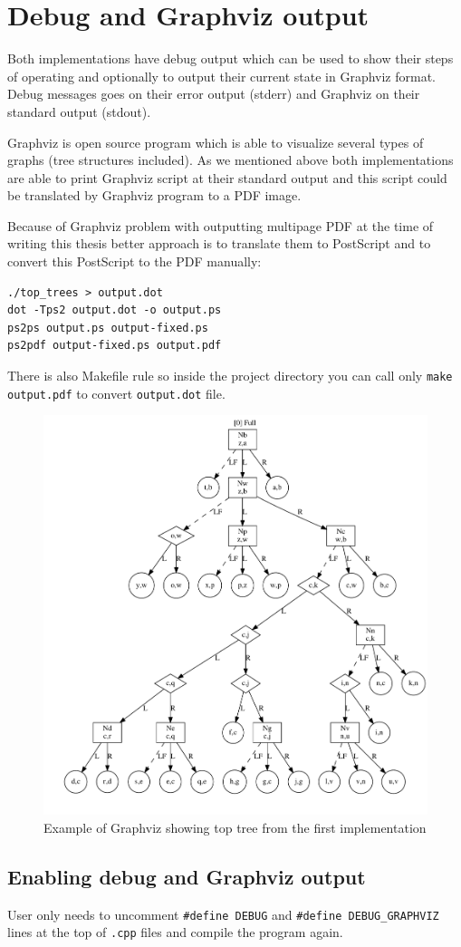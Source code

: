 \goodbreak

\section{Debug and Graphviz output}

Both implementations have debug output which can be used to show their
steps of operating and optionally to output their current state in Graphviz
format. Debug messages goes on their error output (stderr) and Graphviz on
their standard output (stdout).

Graphviz is open source program which is able to visualize several types of
graphs (tree structures included).  As we mentioned above both implementations
are able to print Graphviz script at their standard output and this script could
be translated by Graphviz program to a PDF image.

Because of Graphviz problem with outputting multipage PDF at the time of writing
this thesis better approach is to translate them to PostScript and to convert
this PostScript to the PDF manually:

\begin{verbatim}
./top_trees > output.dot
dot -Tps2 output.dot -o output.ps
ps2ps output.ps output-fixed.ps
ps2pdf output-fixed.ps output.pdf
\end{verbatim}

There is also Makefile rule so inside the project directory you can call only
\texttt{make output.pdf} to convert \texttt{output.dot} file.

\begin{figure}[h]
\centering
\includegraphics[width=0.8\hsize]{pic/chap04_graphviz_example.pdf}
\caption{Example of Graphviz showing top tree from the first implementation}
\end{figure}

\subsection{Enabling debug and Graphviz output}

User only needs to uncomment \texttt{\#define DEBUG} and
\texttt{\#define DEBUG\_GRAPHVIZ} lines at the top of \texttt{.cpp} files and
compile the program again.
